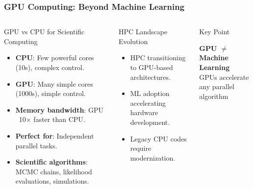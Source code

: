 \documentclass[aspectratio=169]{beamer}
\begin{document}
\begin{frame}
    \frametitle{GPU Computing: Beyond Machine Learning}
    \begin{columns}
        \begin{block}{GPU vs CPU for Scientific Computing}
            \begin{itemize}
                \item \textbf{CPU}: Few powerful cores (10s), complex control.
                \item \textbf{GPU}: Many simple cores (1000s), simple control.
                \item \textbf{Memory bandwidth}: GPU ~10× faster than CPU.
                \item \textbf{Perfect for}: Independent parallel tasks.
                \item \textbf{Scientific algorithms}: MCMC chains, likelihood evaluations, simulations.
            \end{itemize}
        \end{block}
        \begin{block}{HPC Landscape Evolution}
            \begin{itemize}
                \item HPC transitioning to GPU-based architectures.
                \item ML adoption accelerating hardware development.
                \item Legacy CPU codes require modernization.
            \end{itemize}
        \end{block}
        \begin{block}{Key Point}
            \begin{center}
                \textbf{GPU $\neq$ Machine Learning}\\
                GPUs accelerate any parallel algorithm
            \end{center}
        \end{block}
    \end{columns}
\end{frame}
\end{document}
